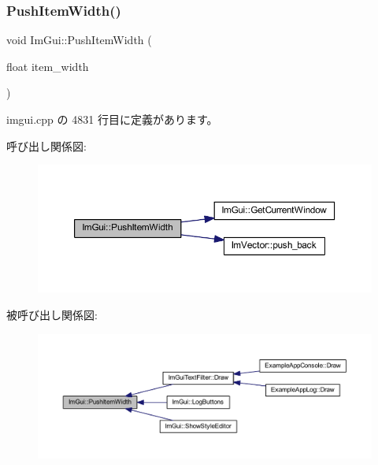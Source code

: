 \subsubsection{\texorpdfstring{Push\+Item\+Width()}{PushItemWidth()}}
{\footnotesize\ttfamily void Im\+Gui\+::\+Push\+Item\+Width (\begin{DoxyParamCaption}\item[{float}]{item\+\_\+width }\end{DoxyParamCaption})}



 imgui.\+cpp の 4831 行目に定義があります。

呼び出し関係図\+:\nopagebreak
\begin{figure}[H]
\begin{center}
\leavevmode
\includegraphics[width=350pt]{namespace_im_gui_a4ad13bf38f0521a339133248ef3e3036_cgraph}
\end{center}
\end{figure}
被呼び出し関係図\+:\nopagebreak
\begin{figure}[H]
\begin{center}
\leavevmode
\includegraphics[width=350pt]{namespace_im_gui_a4ad13bf38f0521a339133248ef3e3036_icgraph}
\end{center}
\end{figure}
\mbox{\label{namespace_im_gui_ab913605fcf6d405d102cdf56cd414a5a}} 
